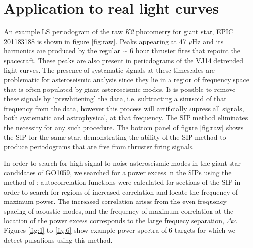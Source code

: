\documentclass[useAMS, usenatbib, preprint, 12pt]{aastex}
\begin{document}
\section{Application to real light curves}
\label{section:rotation}

An example LS periodogram of the raw {\it K2} photometry
for giant star, EPIC 201183188 is shown in figure \ref{fig:raw}.
Peaks appearing at 47 $\mu$Hz and its harmonics are produced by the regular
$\sim$ 6 hour thruster fires that repoint the spacecraft.
These peaks are also present in periodograms of the VJ14 detrended light
curves.
The presence of systematic signals at these timescales are problematic for
asteroseismic analysis since they lie in a region of frequency space
that is often populated by giant asteroseismic modes.
It is possible to remove these signals by `prewhitening' the data, i.e.
subtracting a sinusoid of that frequency from the data, however this process
will artificially supress all signals, both systematic and astrophysical, at
that frequency.
The SIP method eliminates the necessity for any such procedure.
The bottom panel of figure \ref{fig:raw} shows the SIP for the same star,
demonstrating the ability of the SIP method to produce periodograms that
are free from thruster firing signals.

In order to search for high signal-to-noise asteroseismic modes in the giant
star candidates of GO1059, we searched for a power excess in the SIPs using the
method of \citet{Huber2009}: autocorrelation functions were calculated for
sections of the SIP in order to search for regions of increased
correlation and locate the frequency of maximum power.
The increased correlation arises from the even frequency spacing of acoustic
modes, and the frequency of maximum correlation at the location of the power
excess corresponds to the large frequecy separation, $\Delta\nu$.
Figures \ref{fig:1} to \ref{fig:6} show example power spectra of 6 targets for
which we detect pulsations using this method.
\end{document}
